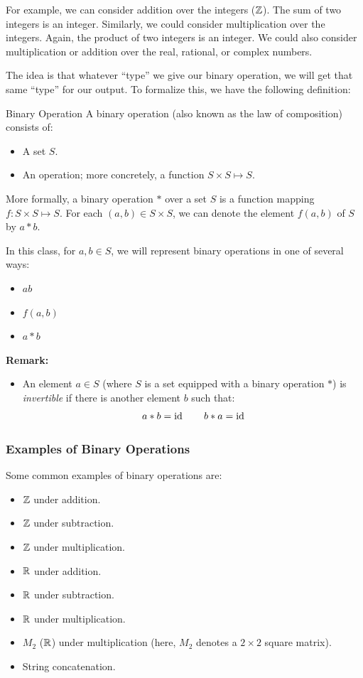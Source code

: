 \documentclass[letterpaper]{article}
\begin{document}
\bigskip 

For example, we can consider addition over the integers ($\mathbb{Z}$). The sum of two integers is an integer. Similarly, we could consider multiplication over the integers. Again, the product of two integers is an integer. We could also consider multiplication or addition over the real, rational, or complex numbers. 

\bigskip 

The idea is that whatever ``type'' we give our binary operation, we will get that same ``type'' for our output. To formalize this, we have the following definition:  
\begin{definition}{Binary Operation}{}
    A binary operation (also known as the law of composition) consists of: 
    \begin{itemize}
        \item A set $S$. 
        \item An operation; more concretely, a function $S \times S \mapsto S$.
    \end{itemize}

    More formally, a binary operation $*$ over a set $S$ is a function mapping $f: S \times S \mapsto S$. For each $(a, b) \in S \times S$, we can denote the element $f(a, b)$ of $S$ by $a * b$.

    \bigskip 

    In this class, for $a, b \in S$, we will represent binary operations in one of several ways: 
    \begin{itemize}
        \item $ab$
        \item $f(a, b)$
        \item $a * b$
    \end{itemize}
\end{definition}

\textbf{Remark:}
\begin{itemize}
    \item An element $a \in S$ (where $S$ is a set equipped with a binary operation $*$) is \emph{invertible} if there is another element $b$ such that: 
    \[a * b = \operatorname{id} \qquad b * a = \operatorname{id}\]
\end{itemize}


\subsubsection{Examples of Binary Operations}
Some common examples of binary operations are: 
\begin{itemize}
    \item $\mathbb{Z}$ under addition. 
    \item $\mathbb{Z}$ under subtraction. 
    \item $\mathbb{Z}$ under multiplication. 
    \item $\mathbb{R}$ under addition. 
    \item $\mathbb{R}$ under subtraction. 
    \item $\mathbb{R}$ under multiplication.
    \item $M_{2}$ ($\mathbb{R}$) under multiplication (here, $M_{2}$ denotes a $2 \times 2$ square matrix). 
    \item String concatenation.
\end{itemize}
\end{document}
